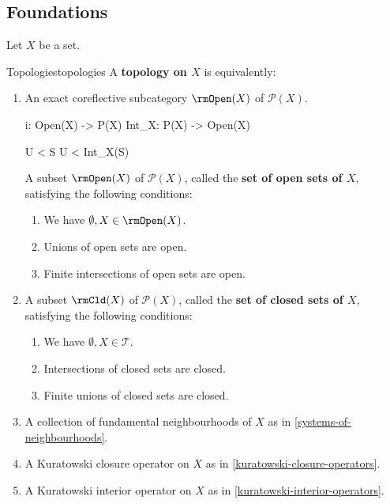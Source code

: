 \subsection{Foundations}\label{subsection-topologies-foundations}
Let $X$ be a set.
\begin{definition}{Topologies}{topologies}%
    A \textbf{topology on $X$} is equivalently:%
    \begin{enumerate}
        \item\label{topologies-1}An exact coreflective subcategory $\rmOpen(X)$ of $\mathcal{P}(X)$.

            i:     Open(X) -> P(X)
            Int_X: P(X) -> Open(X)

            U < S
            U < Int_X(S)


            A subset $\rmOpen(X)$ of $\mathcal{P}(X)$, called the \textbf{set of open sets of $X$}, satisfying the following conditions:
            \begin{enumerate}
                \item\label{topologies-1-a}We have $\emptyset,X\in\rmOpen(X)$.%
                \item\label{topologies-1-b}Unions of open sets are open.
                \item\label{topologies-1-c}Finite intersections of open sets are open.
            \end{enumerate}
        \item\label{topologies-2}A subset $\rmCld(X)$ of $\mathcal{P}(X)$, called the \textbf{set of closed sets of $X$}, satisfying the following conditions:
            \begin{enumerate}
                \item\label{topologies-2-a}We have $\emptyset,X\in\mathcal{T}$.%
                \item\label{topologies-2-b}Intersections of closed sets are closed.
                \item\label{topologies-2-c}Finite unions of closed sets are closed.
            \end{enumerate}
        \item\label{topologies-3}A collection of fundamental neighbourhoods of $X$ as in  \cref{systems-of-neighbourhoods}.
        \item\label{topologies-4}A Kuratowski closure operator  on $X$ as in \cref{kuratowski-closure-operators}.
        \item\label{topologies-5}A Kuratowski interior operator on $X$ as in \cref{kuratowski-interior-operators}.
    \end{enumerate}
\end{definition}
